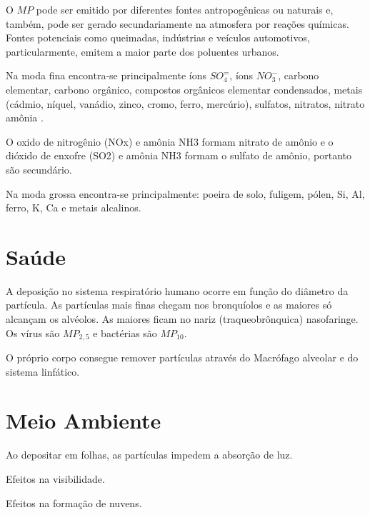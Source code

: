 O $MP$ pode ser emitido por diferentes fontes antropogênicas ou naturais e, 
também, pode ser gerado secundariamente na atmosfera por reações químicas. 
Fontes potenciais como queimadas, indústrias e veículos automotivos, particularmente,
emitem a maior parte dos poluentes urbanos.

Na moda fina encontra-se principalmente íons $SO_4^=$, 
íons $ NO_3^-$, carbono elementar, carbono orgânico, compostos orgânicos elementar
condensados, metais (cádmio, níquel, vanádio, zinco, cromo, ferro, mercúrio), 
sulfatos, nitratos, nitrato amônia \citep{finlayson1999}. 

O oxido de nitrogênio (NOx) e amônia NH3 formam nitrato de amônio e 
o dióxido de enxofre (SO2) e amônia NH3 formam o sulfato de amônio, 
portanto são secundário.

Na moda grossa encontra-se principalmente: poeira de solo, fuligem, 
pólen, Si, Al, ferro, K, Ca e metais alcalinos.

\section{Saúde}

A deposição no sistema respiratório humano ocorre em função do diâmetro da partícula.
As partículas mais finas chegam nos bronquíolos e as maiores só alcançam os alvéolos.
As maiores ficam no nariz (traqueobrônquica) nasofaringe. 
Os vírus são $MP_{2,5}$ e bactérias são $MP_{10}$. 

O próprio corpo consegue remover partículas através do Macrófago alveolar 
e do sistema linfático. 

\section{Meio Ambiente}
Ao depositar em folhas, as partículas impedem a absorção de luz. 

Efeitos na visibilidade.

Efeitos na formação de nuvens.


